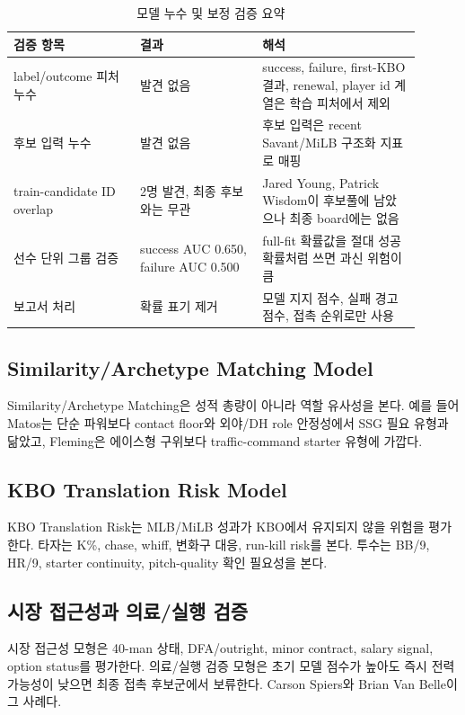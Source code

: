 \documentclass[11pt,a4paper]{article}
\begin{document}
\begin{table}[H]
\centering
\caption{모델 누수 및 보정 검증 요약}
\label{tab:leakage_calibration_audit}
\small
\begin{tabularx}{\linewidth}{L{0.28\linewidth}L{0.27\linewidth}L{0.35\linewidth}}
\toprule
검증 항목 & 결과 & 해석 \\
\midrule
label/outcome 피처 누수 & 발견 없음 & success, failure, first-KBO 결과, renewal, player id 계열은 학습 피처에서 제외 \\
후보 입력 누수 & 발견 없음 & 후보 입력은 recent Savant/MiLB 구조화 지표로 매핑 \\
train-candidate ID overlap & 2명 발견, 최종 후보와는 무관 & Jared Young, Patrick Wisdom이 후보풀에 남았으나 최종 board에는 없음 \\
선수 단위 그룹 검증 & success AUC 0.650, failure AUC 0.500 & full-fit 확률값을 절대 성공확률처럼 쓰면 과신 위험이 큼 \\
보고서 처리 & 확률 표기 제거 & 모델 지지 점수, 실패 경고 점수, 접촉 순위로만 사용 \\
\bottomrule
\end{tabularx}
\end{table}

\subsection{Similarity/Archetype Matching Model}
Similarity/Archetype Matching은 성적 총량이 아니라 역할 유사성을 본다. 예를 들어 Matos는 단순 파워보다 contact floor와 외야/DH role 안정성에서 SSG 필요 유형과 닮았고, Fleming은 에이스형 구위보다 traffic-command starter 유형에 가깝다.

\subsection{KBO Translation Risk Model}
KBO Translation Risk는 MLB/MiLB 성과가 KBO에서 유지되지 않을 위험을 평가한다. 타자는 K\%, chase, whiff, 변화구 대응, run-kill risk를 본다. 투수는 BB/9, HR/9, starter continuity, pitch-quality 확인 필요성을 본다.

\subsection{시장 접근성과 의료/실행 검증}
시장 접근성 모형은 40-man 상태, DFA/outright, minor contract, salary signal, option status를 평가한다. 의료/실행 검증 모형은 초기 모델 점수가 높아도 즉시 전력 가능성이 낮으면 최종 접촉 후보군에서 보류한다. Carson Spiers와 Brian Van Belle이 그 사례다.
\end{document}
